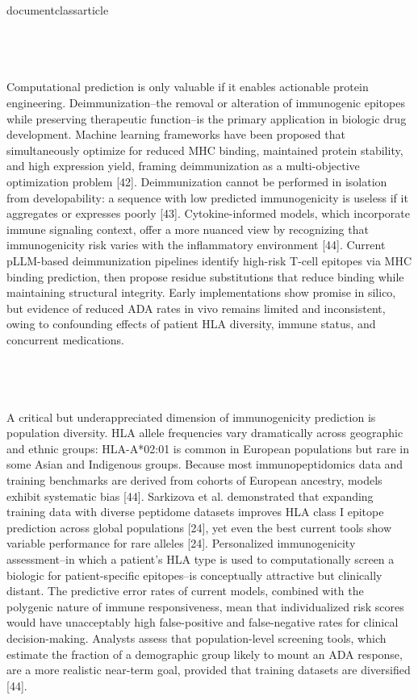 \\documentclass{article}
\begin{document}
\subsection{}

Computational prediction is only valuable if it enables actionable protein engineering. Deimmunization--the removal or alteration of immunogenic epitopes while preserving therapeutic function--is the primary application in biologic drug development. Machine learning frameworks have been proposed that simultaneously optimize for reduced MHC binding, maintained protein stability, and high expression yield, framing deimmunization as a multi-objective optimization problem [42]. Deimmunization cannot be performed in isolation from developability: a sequence with low predicted immunogenicity is useless if it aggregates or expresses poorly [43]. Cytokine-informed models, which incorporate immune signaling context, offer a more nuanced view by recognizing that immunogenicity risk varies with the inflammatory environment [44]. Current pLLM-based deimmunization pipelines identify high-risk T-cell epitopes via MHC binding prediction, then propose residue substitutions that reduce binding while maintaining structural integrity. Early implementations show promise in silico, but evidence of reduced ADA rates in vivo remains limited and inconsistent, owing to confounding effects of patient HLA diversity, immune status, and concurrent medications.

\subsection{}

A critical but underappreciated dimension of immunogenicity prediction is population diversity. HLA allele frequencies vary dramatically across geographic and ethnic groups: HLA-A*02:01 is common in European populations but rare in some Asian and Indigenous groups. Because most immunopeptidomics data and training benchmarks are derived from cohorts of European ancestry, models exhibit systematic bias [44]. Sarkizova et al. demonstrated that expanding training data with diverse peptidome datasets improves HLA class I epitope prediction across global populations [24], yet even the best current tools show variable performance for rare alleles [24]. Personalized immunogenicity assessment--in which a patient's HLA type is used to computationally screen a biologic for patient-specific epitopes--is conceptually attractive but clinically distant. The predictive error rates of current models, combined with the polygenic nature of immune responsiveness, mean that individualized risk scores would have unacceptably high false-positive and false-negative rates for clinical decision-making. Analysts assess that population-level screening tools, which estimate the fraction of a demographic group likely to mount an ADA response, are a more realistic near-term goal, provided that training datasets are diversified [44].
\end{document}
